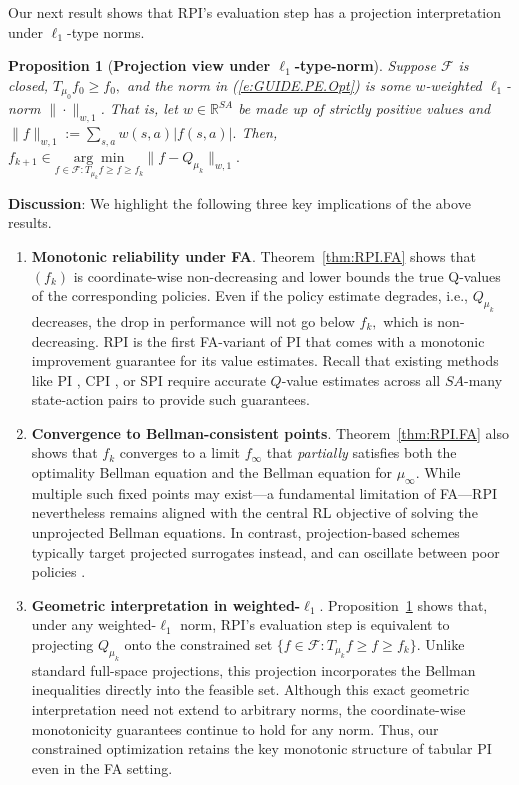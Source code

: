 \documentclass[twoside]{article}
\theoremstyle{plain}
\newtheorem{proposition}[theorem]{Proposition}
\theoremstyle{definition}
\theoremstyle{remark}
\newcommand{\bR}{\mathbb{R}}
\newcommand{\cF}{\mathcal{F}}
\renewcommand{\eqref}[1]{(\ref{#1})}
\begin{document}
Our next result shows that RPI's evaluation step has a projection interpretation under $\ell_1$-type norms. 

\begin{proposition}[\textbf{Projection view under $\ell_1$-type-norm}]
\label{prop:RPI.l1.projection}
Suppose $\cF$ is closed, $T_{\mu_0} f_0 \geq f_0,$ and the norm in \eqref{e:GUIDE.PE.Opt} is some $w$-weighted $\ell_1$-norm $\|\cdot\|_{w, 1}$. That is, let $w \in \bR^{SA}$ be made up of strictly positive values and $\|f\|_{w, 1} := \sum_{s, a} w(s, a) |f(s, a)|.$ Then, $f_{k + 1} \in \underset{f \in \cF: T_{\mu_k} f \geq f \geq f_k}{\arg\min} \|f - Q_{\mu_k}\|_{w, 1}.$ 
%        
\end{proposition}

\textbf{Discussion}: We highlight the following three key implications of the above results.
%
\begin{enumerate}[leftmargin=*]
    \item \textbf{Monotonic reliability under FA}. Theorem~\ref{thm:RPI.FA} shows that $(f_k)$ is coordinate-wise non-decreasing and lower bounds the true Q-values of the corresponding policies. Even if the policy estimate  degrades, i.e., $Q_{\mu_k}$ decreases, the drop in performance will not go below $f_k,$ which is non-decreasing. RPI is the first FA-variant of PI that comes with a monotonic improvement guarantee for its value estimates. Recall that existing methods like PI \citep{howard1960dynamic}, CPI \citep{kakade2002approximately}, or SPI \citep{metelli2021safe} require accurate $Q$-value estimates across all $SA$-many state-action pairs to provide such guarantees. 
    
    \item \textbf{Convergence to Bellman-consistent points}. Theorem~\ref{thm:RPI.FA} also shows that $f_k$ converges to a limit $f_\infty$ that \textit{partially} satisfies both the optimality Bellman equation and the Bellman equation for $\mu_\infty$. While multiple such fixed points may exist---a fundamental limitation of FA---RPI nevertheless remains aligned with the central RL objective of solving the unprojected Bellman equations. In contrast, projection-based schemes typically target projected surrogates instead, and can oscillate between poor policies \citep{bertsekas2011approximate}.

    \item \textbf{Geometric interpretation in weighted-$\ell_1$}. Proposition~\ref{prop:RPI.l1.projection} shows that, under any weighted-$\ell_1$ norm, RPI's evaluation step is equivalent to projecting $Q_{\mu_k}$ onto the constrained set $\{f \in \cF: T_{\mu_k}f \geq f \geq f_k\}$. Unlike standard full-space projections, this projection incorporates the Bellman inequalities directly into the feasible set. Although this exact geometric interpretation need not extend to arbitrary norms, the coordinate-wise monotonicity guarantees continue to hold for any norm. Thus, our constrained optimization retains the key monotonic structure of tabular PI even in the FA setting.
\end{enumerate}
\end{document}
